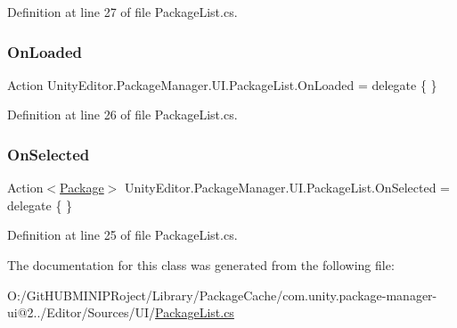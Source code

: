 Definition at line 27 of file Package\+List.\+cs.

\mbox{\label{class_unity_editor_1_1_package_manager_1_1_u_i_1_1_package_list_a3756ca2e840c663d3efb5881a8314b9b}} 
\subsubsection{\texorpdfstring{OnLoaded}{OnLoaded}}
{\footnotesize\ttfamily Action Unity\+Editor.\+Package\+Manager.\+U\+I.\+Package\+List.\+On\+Loaded = delegate \{ \}}



Definition at line 26 of file Package\+List.\+cs.

\mbox{\label{class_unity_editor_1_1_package_manager_1_1_u_i_1_1_package_list_a853b9ef8931a5f303d0929c2a691edf7}} 
\subsubsection{\texorpdfstring{OnSelected}{OnSelected}}
{\footnotesize\ttfamily Action$<$\mbox{\hyperlink{class_unity_editor_1_1_package_manager_1_1_u_i_1_1_package}{Package}}$>$ Unity\+Editor.\+Package\+Manager.\+U\+I.\+Package\+List.\+On\+Selected = delegate \{ \}}



Definition at line 25 of file Package\+List.\+cs.



The documentation for this class was generated from the following file\+:\begin{DoxyCompactItemize}
\item 
O\+:/\+Git\+H\+U\+B\+M\+I\+N\+I\+P\+Roject/\+Library/\+Package\+Cache/com.\+unity.\+package-\/manager-\/ui@2../\+Editor/\+Sources/\+U\+I/\mbox{\hyperlink{_package_list_8cs}{Package\+List.\+cs}}\end{DoxyCompactItemize}
